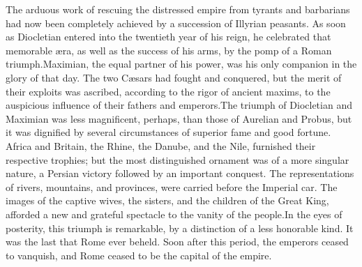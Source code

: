 
The arduous work of rescuing the distressed empire from tyrants
and barbarians had now been completely achieved by a succession
of Illyrian peasants. As soon as Diocletian entered into the
twentieth year of his reign, he celebrated that memorable æra, as
well as the success of his arms, by the pomp of a Roman triumph.\footnotemark[85]
Maximian, the equal partner of his power, was his only
companion in the glory of that day. The two Cæsars had fought and
conquered, but the merit of their exploits was ascribed,
according to the rigor of ancient maxims, to the auspicious
influence of their fathers and emperors.\footnotemark[86] The triumph of
Diocletian and Maximian was less magnificent, perhaps, than those
of Aurelian and Probus, but it was dignified by several
circumstances of superior fame and good fortune. Africa and
Britain, the Rhine, the Danube, and the Nile, furnished their
respective trophies; but the most distinguished ornament was of a
more singular nature, a Persian victory followed by an important
conquest. The representations of rivers, mountains, and
provinces, were carried before the Imperial car. The images of
the captive wives, the sisters, and the children of the Great
King, afforded a new and grateful spectacle to the vanity of the
people.\footnotemark[87] In the eyes of posterity, this triumph is remarkable,
by a distinction of a less honorable kind. It was the last that
Rome ever beheld. Soon after this period, the emperors ceased to
vanquish, and Rome ceased to be the capital of the empire.





